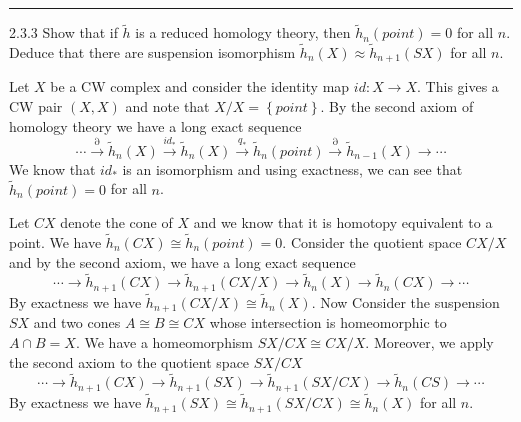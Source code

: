 \documentclass[a4paper, 12pt]{article}
\begin{document}
\noindent\rule{7in}{2.8pt}
\begin{problem}{2.3.3}
Show that if \(\tilde{h}\) is a reduced homology theory, then \(\tilde{h}_n(point)=0\) for all \(n\). Deduce that there are suspension isomorphism \(\tilde{h}_n(X)\approx \tilde{h}_{n+1}(SX)\) for all \(n\).
\end{problem}
\begin{solution}
Let \(X\) be a CW complex and consider the identity map \(id:X\rightarrow X\). This gives a CW pair \((X,X)\) and note that \(X/X=\left\{ point \right\}\). By the second axiom of homology theory we have a long exact sequence 
\[\cdots\xrightarrow{\partial}\tilde{h}_n(X)\xrightarrow{id_*}\tilde{h}_n(X)\xrightarrow{q_*}\tilde{h}_n(point)\xrightarrow{\partial}\tilde{h}_{n-1}(X)\rightarrow \cdots\]
We know that \(id_*\) is an isomorphism and using exactness, we can see that \(\tilde{h}_n(point)=0\) for all \(n\). 

Let \(CX\) denote the cone of \(X\) and we know that it is homotopy equivalent to a point. We have \(\tilde{h}_n(CX)\cong \tilde{h}_n(point)=0\). Consider the quotient space \(CX/X\) and by the second axiom, we have a long exact sequence 
\[\cdots\rightarrow \tilde{h}_{n+1}(CX)\rightarrow \tilde{h}_{n+1}(CX/X)\rightarrow \tilde{h}_n(X)\rightarrow \tilde{h}_n(CX)\rightarrow \cdots\]
By exactness we have \(\tilde{h}_{n+1}(CX/X)\cong \tilde{h}_n(X)\). Now Consider the suspension \(SX\) and two cones \(A\cong B\cong CX\) whose intersection is homeomorphic to \(A\cap B=X\). We have a homeomorphism \(SX/CX\cong CX/X\). Moreover, we apply the second 
axiom to the quotient space \(SX/CX\)
\[\cdots\rightarrow \tilde{h}_{n+1}(CX)\rightarrow \tilde{h}_{n+1}(SX)\rightarrow \tilde{h}_{n+1}(SX/CX)\rightarrow \tilde{h}_n(CS)\rightarrow \cdots\]
By exactness we have 
\(\tilde{h}_{n+1}(SX)\cong \tilde{h}_{n+1}(SX/CX)\cong \tilde{h}_n(X)\) for all \(n\).
\end{solution}
\end{document}
